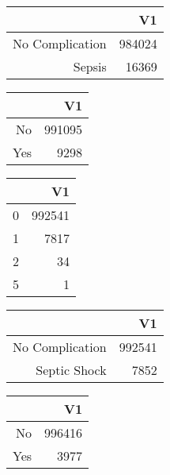 \bigskip\bigskip
\centering
\begin{tabular}{rr}
  \hline
 & V1 \\ 
  \hline
No Complication & 984024 \\ 
  Sepsis & 16369 \\ 
   \hline
\end{tabular}

\bigskip\bigskip
\centering
\begin{tabular}{rr}
  \hline
 & V1 \\ 
  \hline
No & 991095 \\ 
  Yes & 9298 \\ 
   \hline
\end{tabular}

\bigskip\bigskip
\centering
\begin{tabular}{rr}
  \hline
 & V1 \\ 
  \hline
0 & 992541 \\ 
  1 & 7817 \\ 
  2 &  34 \\ 
  5 &   1 \\ 
   \hline
\end{tabular}

\bigskip\bigskip
\centering
\begin{tabular}{rr}
  \hline
 & V1 \\ 
  \hline
No Complication & 992541 \\ 
  Septic Shock & 7852 \\ 
   \hline
\end{tabular}

\bigskip\bigskip
\centering
\begin{tabular}{rr}
  \hline
 & V1 \\ 
  \hline
No & 996416 \\ 
  Yes & 3977 \\ 
   \hline
\end{tabular}

